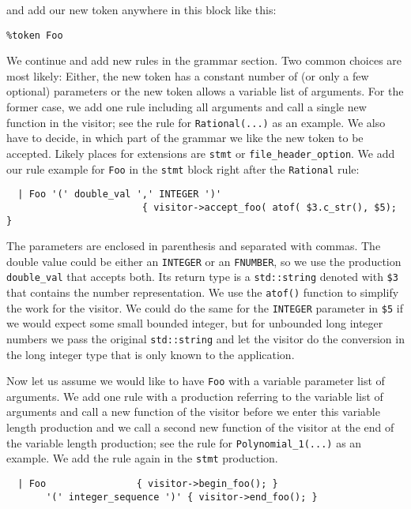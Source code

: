 \noindent
and add our new token anywhere in this block like this:

\begin{verbatim}
%token Foo
\end{verbatim}

\noindent
We continue and add new rules in the grammar section. Two common
choices are most likely: Either, the new token has a constant number
of (or only a few optional) parameters or the new token allows a
variable list of arguments. For the former case, we add one rule
including all arguments and call a single new function in the visitor;
see the rule for \texttt{Rational(...)} as an example. We also have to
decide, in which part of the grammar we like the new token to be
accepted. Likely places for extensions are \texttt{stmt} or
\texttt{file\_header\_option}. We add our rule example for
\texttt{Foo} in the \texttt{stmt} block right after the
\texttt{Rational} rule:

\begin{verbatim}
  | Foo '(' double_val ',' INTEGER ')'
                        { visitor->accept_foo( atof( $3.c_str(), $5); }
\end{verbatim}

\noindent
The parameters are enclosed in parenthesis and separated with
commas. The double value could be either an \texttt{INTEGER} or an
\texttt{FNUMBER}, so we use the production \texttt{double\_val} that
accepts both. Its return type is a \texttt{std::string} denoted with
\texttt{\$3} that contains the number representation. We use the
\texttt{atof()} function to simplify the work for the visitor. We
could do the same for the \texttt{INTEGER} parameter in \texttt{\$5}
if we would expect some small bounded integer, but for unbounded long
integer numbers we pass the original \texttt{std::string} and let the
visitor do the conversion in the long integer type that is only known
to the application.

Now let us assume we would like to have \texttt{Foo} with a variable
parameter list of arguments. We add one rule with a production
referring to the variable list of arguments and call a new function
of the visitor before we enter this variable length production  and we call a 
second new function of the visitor at the end of the variable length
production; see the rule for \texttt{Polynomial\_1(...)} as an example.
We add the rule again in the \texttt{stmt} production.

\begin{verbatim}
  | Foo                { visitor->begin_foo(); }
       '(' integer_sequence ')' { visitor->end_foo(); }
\end{verbatim}

